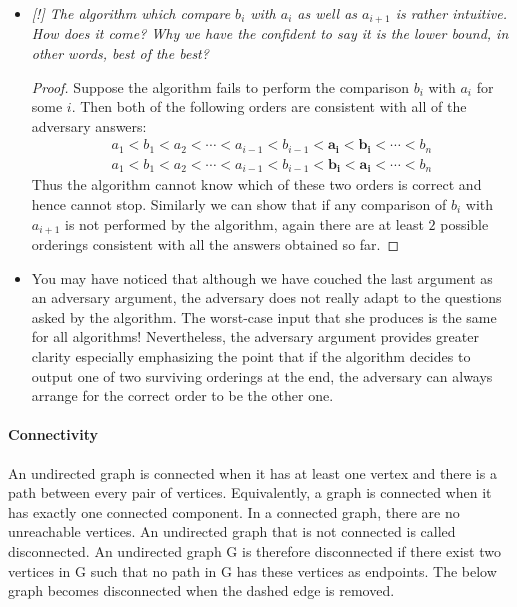 \documentclass[en,hazy,blue,screen,14pt]{elegantnote}
\begin{document}
\begin{itemize}
\begin{itemize}
\begin{proof}
This specific claim lists $2n-1$ comparisons and hence
would prove the lower bound. But the adversary should give a consistent
set of answers.
\end{proof}
\item \emph{{[}!{]} The algorithm which compare $b_{i}$ with $a_{i}$ as
well as $a_{i+1}$ is rather intuitive. How does it come? Why we
have the confident to say it is the lower bound, in other words, best
of the best?}
\begin{proof}
Suppose the algorithm fails to perform the comparison $b_{i}$ with
$a_{i}$ for some $i$. Then both of the following orders are consistent
with all of the adversary answers:
\begin{align*}
a_{1}<b_{1}<a_{2}<\cdots<a_{i-1}<b_{i-1}<\boldsymbol{a_{i}<b_{i}}<\cdots<b_{n}\\
a_{1}<b_{1}<a_{2}<\cdots<a_{i-1}<b_{i-1}<\boldsymbol{b_{i}<a_{i}}<\cdots<b_{n}
\end{align*}
 Thus the algorithm cannot know which of these two orders is correct
and hence cannot stop. Similarly we can show that if any comparison
of $b_{i}$ with $a_{i+1}$ is not performed by the algorithm, again
there are at least $2$ possible orderings consistent with all the
answers obtained so far. 
\end{proof}
\item You may have noticed that although we have couched the last argument
as an adversary argument, the adversary does not really adapt to the
questions asked by the algorithm. The worst-case input that she produces
is the same for all algorithms! Nevertheless, the adversary argument
provides greater clarity especially emphasizing the point that if
the algorithm decides to output one of two surviving orderings at
the end, the adversary can always arrange for the correct order to
be the other one. 
\end{itemize}
\end{itemize}

\paragraph*{Connectivity}

An undirected graph is connected when it has at least one vertex and
there is a path between every pair of vertices. Equivalently, a graph
is connected when it has exactly one connected component. In a connected
graph, there are no unreachable vertices. An undirected graph that
is not connected is called disconnected. An undirected graph G is
therefore disconnected if there exist two vertices in G such that
no path in G has these vertices as endpoints. The below graph becomes
disconnected when the dashed edge is removed.
\end{document}
